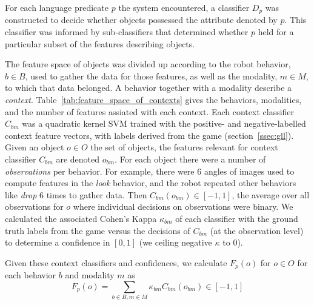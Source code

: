 For each language predicate $p$ the system encountered, a classifier $D_p$ was constructed to decide whether objects possessed the attribute denoted by $p$.
This classifier was informed by sub-classifiers that determined whether $p$ held for a particular subset of the features describing objects.

The feature space of objects was divided up according to the robot behavior, $b\in B$, used to gather the data for those features, as well as the modality, $m\in M$, to which that data belonged.
A behavior together with a modality describe a \textit{context}.
Table~\ref{tab:feature_space_of_contexts} gives the behaviors, modalities, and the number of features assiated with each context.
Each context classifier $C_{bm}$ was a quadratic kernel SVM trained with the positive- and negative-labelled context feature vectors, with labels derived from the \ispy game (section~\ref{ssec:gll}).
Given an object $o\in O$ the set of objects, the features relevant for context classifier $C_{bm}$ are denoted $o_{bm}$.
For each object there were a number of \textit{observations} per behavior.
For example, there were 6 angles of images used to compute features in the \textit{look} behavior, and the robot repeated other behaviors like \textit{drop} 6 times to gather data.
Then $C_{bm}(o_{bm})\in [-1,1]$, the average over all observations for $o$ where individual decisions on observations were binary.
We calculated the associated Cohen's Kappa $\kappa_{bm}$ of each classifier with the ground truth labels from the \ispy game versus the decisions of $C_{bm}$ (at the observation level) to determine a confidence in $[0,1]$ (we ceiling negative $\kappa$ to $0$).

Given these context classifiers and confidences, we calculate $F_p(o)$ for $o\in O$ for each behavior $b$ and modality $m$ as
\begin{equation}
	F_p(o) = \sum_{b\in B,m\in M}{\kappa_{bm} C_{bm}(o_{bm})} \in [-1,1]
\end{equation}